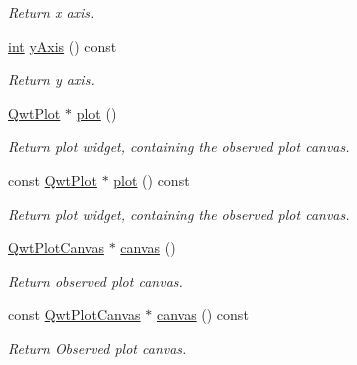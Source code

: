 \begin{DoxyCompactItemize}
\begin{DoxyCompactList}\small\item\em Return x axis. \end{DoxyCompactList}\item 
\hyperlink{ioapi_8h_a787fa3cf048117ba7123753c1e74fcd6}{int} \hyperlink{class_qwt_plot_picker_a3068fb734845abfdf5dff00ead18377f}{y\-Axis} () const 
\begin{DoxyCompactList}\small\item\em Return y axis. \end{DoxyCompactList}\item 
\hyperlink{class_qwt_plot}{Qwt\-Plot} $\ast$ \hyperlink{class_qwt_plot_picker_ac5906d5fe7543f3db7808da44d8197a9}{plot} ()
\begin{DoxyCompactList}\small\item\em Return plot widget, containing the observed plot canvas. \end{DoxyCompactList}\item 
const \hyperlink{class_qwt_plot}{Qwt\-Plot} $\ast$ \hyperlink{class_qwt_plot_picker_a88103b56426ff2a5fb8713ae8ab2d191}{plot} () const 
\begin{DoxyCompactList}\small\item\em Return plot widget, containing the observed plot canvas. \end{DoxyCompactList}\item 
\hyperlink{class_qwt_plot_canvas}{Qwt\-Plot\-Canvas} $\ast$ \hyperlink{class_qwt_plot_picker_a402820e19bc6a9a33184264345703015}{canvas} ()
\begin{DoxyCompactList}\small\item\em Return observed plot canvas. \end{DoxyCompactList}\item 
const \hyperlink{class_qwt_plot_canvas}{Qwt\-Plot\-Canvas} $\ast$ \hyperlink{class_qwt_plot_picker_a6b3a29ebce6d9e4991b78b0c8887b124}{canvas} () const 
\begin{DoxyCompactList}\small\item\em Return Observed plot canvas. \end{DoxyCompactList}\end{DoxyCompactItemize}
